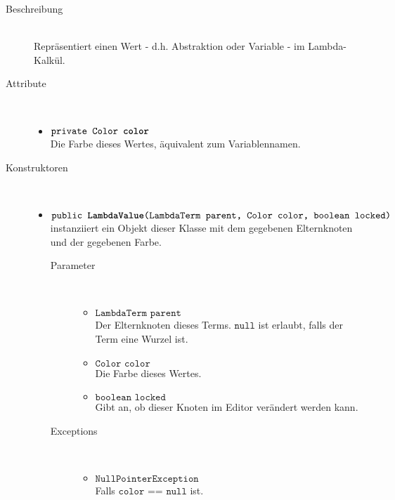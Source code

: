 \begin{description}
\item[Beschreibung] \hfill \\ Repräsentiert einen Wert - d.h. Abstraktion oder Variable - im Lambda-Kalkül.
\item[Attribute] \hfill \\
	\vspace{-.8cm}
	\begin{itemize}
		\item $\texttt{private Color \textbf{color}}$ \\ Die Farbe dieses Wertes, äquivalent zum Variablennamen.
	\end{itemize}
	
\item[Konstruktoren] \hfill \\
	\vspace{-.8cm}
	\begin{itemize}
		\item $\texttt{public \textbf{LambdaValue}(LambdaTerm parent, Color color, boolean locked)}$ \\ instanziiert ein Objekt dieser Klasse mit dem gegebenen Elternknoten und der gegebenen Farbe.
		\begin{description}
			\item[Parameter] \hfill \\
			\vspace{-.8cm}
			\begin{itemize}
				\item $\texttt{LambdaTerm parent}$ \\ Der Elternknoten dieses Terms. $\texttt{null}$ ist erlaubt, falls der Term eine Wurzel ist.
				\item $\texttt{Color color}$ \\ Die Farbe dieses Wertes.
				\item $\texttt{boolean locked}$ \\ Gibt an, ob dieser Knoten im Editor verändert werden kann.
			\end{itemize}
			\item[Exceptions] \hfill \\
			\vspace{-.8cm}
			\begin{itemize}
				\item $\texttt{NullPointerException}$ \\ Falls $\texttt{color == null}$ ist.
			\end{itemize}
		\end{description}
	\end{itemize}
	

\end{description}
